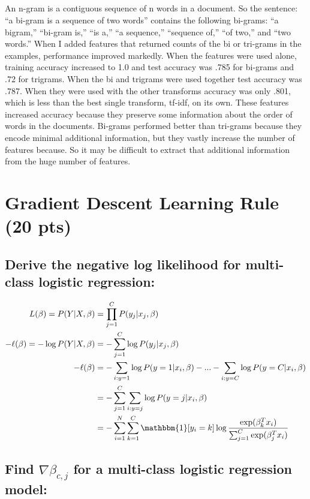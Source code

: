 \documentclass[11pt]{article}
\begin{document}
\subparagraph{}

An n-gram is a contiguous sequence of n words in a document. So the sentence: ``a bi-gram is a sequence of two words'' contains the following bi-grams: ``a bigram,'' ``bi-gram is,'' ``is a,'' ``a sequence,'' ``sequence of,'' ``of two,'' and ``two words.'' When I added features that returned counts of the bi or tri-grams in the examples, performance improved markedly. When the features were used alone, training accuracy increased to 1.0 and test accuracy was .785 for bi-grams and .72 for trigrams. When the bi and trigrams were used together test accuracy was .787. When they were used with the other transforms accuracy was only .801, which is less than the best single transform, tf-idf, on its own. These features increased accuracy because they preserve some information about the order of words in the documents. Bi-grams performed better than tri-grams because they encode minimal additional information, but they vastly increase the number of features because. So it may be difficult to extract that additional information from the huge number of features.

\section{Gradient Descent Learning Rule (20 pts)}

\subsection{Derive the negative log likelihood for multi-class logistic regression:}

\begin{align*}
	L (\beta) = P(Y \vert X, \beta) &= \prod_{j = 1}^{C} P(y_{j} \vert x_{j}, \beta)\\
	-\ell(\beta) = -\log P(Y \vert X, \beta) &= -\sum_{j = 1}^{C} \log P(y_{j} \vert x_{j}, \beta)\\
	-\ell(\beta) &= -\sum_{i:y=1}\log P(y = 1 \vert x_{i}, \beta) - ... - \sum_{i:y=C}\log P(y = C \vert x_{i}, \beta)\\
	&= -\sum_{j = 1}^{C} \sum_{i:y=j} \log P(y = j \vert x_{i}, \beta)\\
	&= -\sum_{i = 1}^{N} \sum_{k=1}^{C} \mathbbm{1}[y_{i} = k] \log \frac{\exp(\beta_{k}^{T}x_{i})}{\sum_{j=1}^{C}\exp(\beta_{j}^{T}x_{i})}\\
\end{align*}


\subsection{Find $\nabla \beta_{c,j}$ for a multi-class logistic regression model:}
\end{document}
